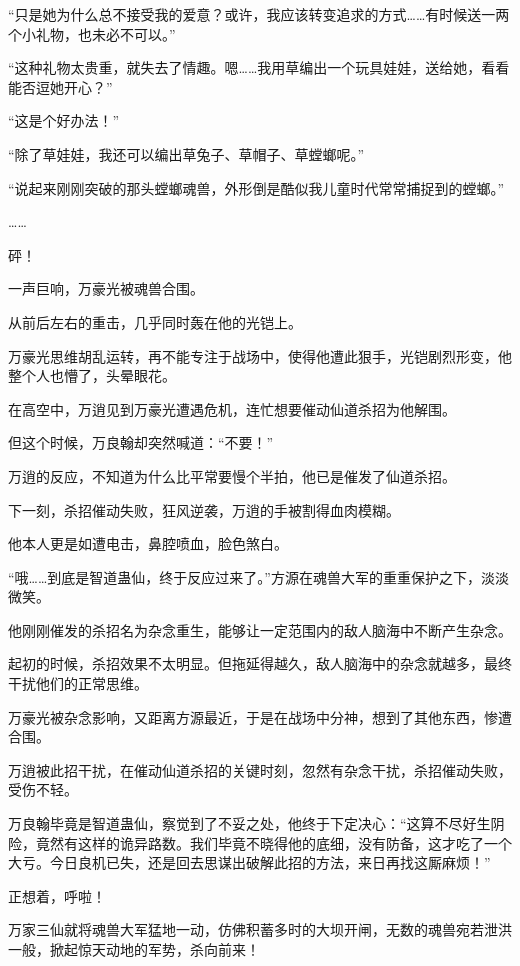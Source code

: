 \begin{this_body}
“只是她为什么总不接受我的爱意？或许，我应该转变追求的方式……有时候送一两个小礼物，也未必不可以。”

“这种礼物太贵重，就失去了情趣。嗯……我用草编出一个玩具娃娃，送给她，看看能否逗她开心？”

“这是个好办法！”

“除了草娃娃，我还可以编出草兔子、草帽子、草螳螂呢。”

“说起来刚刚突破的那头螳螂魂兽，外形倒是酷似我儿童时代常常捕捉到的螳螂。”

……

砰！

一声巨响，万豪光被魂兽合围。

从前后左右的重击，几乎同时轰在他的光铠上。

万豪光思维胡乱运转，再不能专注于战场中，使得他遭此狠手，光铠剧烈形变，他整个人也懵了，头晕眼花。

在高空中，万逍见到万豪光遭遇危机，连忙想要催动仙道杀招为他解围。

但这个时候，万良翰却突然喊道：“不要！”

万逍的反应，不知道为什么比平常要慢个半拍，他已是催发了仙道杀招。

下一刻，杀招催动失败，狂风逆袭，万逍的手被割得血肉模糊。

他本人更是如遭电击，鼻腔喷血，脸色煞白。

“哦……到底是智道蛊仙，终于反应过来了。”方源在魂兽大军的重重保护之下，淡淡微笑。

他刚刚催发的杀招名为杂念重生，能够让一定范围内的敌人脑海中不断产生杂念。

起初的时候，杀招效果不太明显。但拖延得越久，敌人脑海中的杂念就越多，最终干扰他们的正常思维。

万豪光被杂念影响，又距离方源最近，于是在战场中分神，想到了其他东西，惨遭合围。

万逍被此招干扰，在催动仙道杀招的关键时刻，忽然有杂念干扰，杀招催动失败，受伤不轻。

万良翰毕竟是智道蛊仙，察觉到了不妥之处，他终于下定决心：“这算不尽好生阴险，竟然有这样的诡异路数。我们毕竟不晓得他的底细，没有防备，这才吃了一个大亏。今日良机已失，还是回去思谋出破解此招的方法，来日再找这厮麻烦！”

正想着，呼啦！

万家三仙就将魂兽大军猛地一动，仿佛积蓄多时的大坝开闸，无数的魂兽宛若泄洪一般，掀起惊天动地的军势，杀向前来！

\end{this_body}

